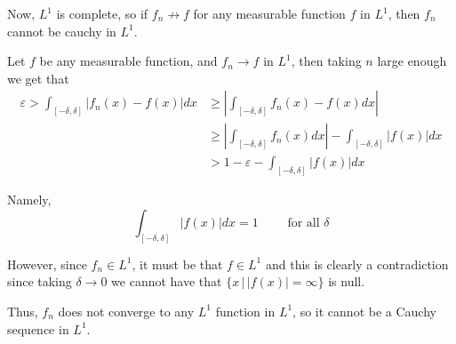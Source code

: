 \documentclass[12pt]{Homework}
\begin{document}
\begin{solution}
Now, $L^1$ is complete, so if $f_n\not\to f$ for any measurable function $f$ in $L^1$, then $f_n$ cannot be cauchy in $L^1.$

Let $f$ be any measurable function, and $f_n\to f$ in $L^1$, then taking $n$ large enough we get that  \begin{align*}
    \varepsilon>\int_{[-\delta,\delta]}|f_n(x)-f(x)|dx&\ge\left|\int_{[-\delta,\delta]}f_n(x)-f(x)dx\right|\\
    &\ge\left|\int_{[-\delta,\delta]}f_n(x)dx\right|-\int_{[-\delta,\delta]}|f(x)|dx\\
    &>1-\varepsilon-\int_{[-\delta,\delta]}|f(x)|dx
\end{align*}

Namely, $$\int_{[-\delta,\delta]}|f(x)|dx=1\qquad\text{ for all }\delta$$

However, since $f_n\in L^1$, it must be that $f\in L^1$ and this is clearly a contradiction since taking $\delta\to0$ we cannot have that $\{x\,|\,|f(x)|=\infty\}$ is null.

Thus, $f_n$ does not converge to any $L^1$ function in $L^1$, so it cannot be a Cauchy sequence in $L^1.$
\end{solution}
\vspace{0.5cm}
\end{document}
